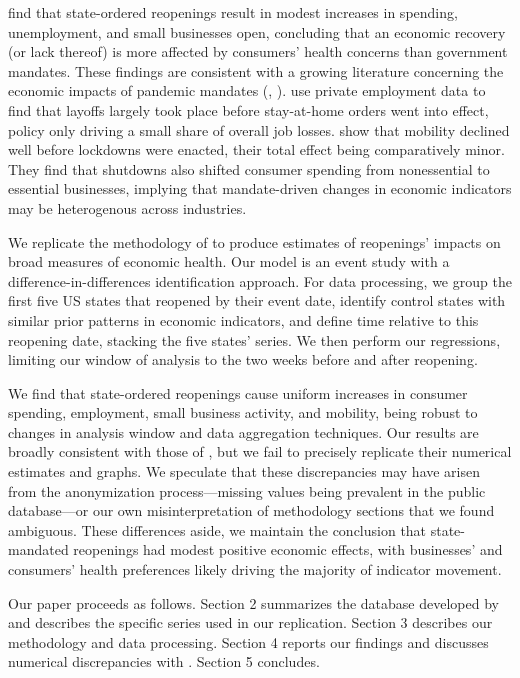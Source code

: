 \documentclass[12pt,letterpaper]{article}
\begin{document}
\citeauthor{Chetty2020} find that state-ordered reopenings result in modest increases in spending, unemployment, and small businesses open, concluding that an economic recovery (or lack thereof) is more affected by consumers’ health concerns than government mandates. These findings are consistent with a growing literature concerning the economic impacts of pandemic mandates (\textcite{Bartik2020}, \textcite{Goolsbee2020}). \citeauthor{Bartik2020} use private employment data to find that layoffs largely took place before stay-at-home orders went into effect, policy only driving a small share of overall job losses. \citeauthor{Goolsbee2020} show that mobility declined well before lockdowns were enacted, their total effect being comparatively minor. They find that shutdowns also shifted consumer spending from nonessential to essential businesses, implying that mandate-driven changes in economic indicators may be heterogenous across industries. 

We replicate the methodology of \citeauthor{Chetty2020} to produce estimates of reopenings’ impacts on broad measures of economic health. Our model is an event study with a difference-in-differences identification approach. For data processing, we group the first five US states that reopened by their event date, identify control states with similar prior patterns in economic indicators, and define time relative to this reopening date, stacking the five states’ series. We then perform our regressions, limiting our window of analysis to the two weeks before and after reopening.

We find that state-ordered reopenings cause uniform increases in consumer spending, employment, small business activity, and mobility, being robust to changes in analysis window and data aggregation techniques. Our results are broadly consistent with those of \citeauthor{Chetty2020}, but we fail to precisely replicate their numerical estimates and graphs. We speculate that these discrepancies may have arisen from the anonymization process---missing values being prevalent in the public database---or our own misinterpretation of methodology sections that we found ambiguous. These differences aside, we maintain the conclusion that state-mandated reopenings had modest positive economic effects, with businesses’ and consumers’ health preferences likely driving the majority of indicator movement.

Our paper proceeds as follows. Section 2 summarizes the database developed by \citeauthor{Chetty2020} and describes the specific series used in our replication. Section 3 describes our methodology and data processing. Section 4 reports our findings and discusses numerical discrepancies with \citeauthor{Chetty2020}. Section 5 concludes.
\end{document}
